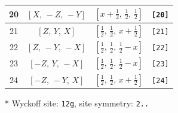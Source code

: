 \documentclass[fleqn,8pt]{jsarticle}
\begin{document}
\begin{longtable}{cccc}
20 & $\left[ X,\, - Z,\, - Y \right]$ & $\left[ x + \frac{1}{2},\, \frac{1}{2},\, \frac{1}{2} \right]$ & {\tt [20]} \\ \hline
21 & $\left[ Z,\, Y,\, X \right]$ & $\left[ \frac{1}{2},\, \frac{1}{2},\, x + \frac{1}{2} \right]$ & {\tt [21]} \\ \hline
22 & $\left[ Z,\, - Y,\, - X \right]$ & $\left[ \frac{1}{2},\, \frac{1}{2},\, \frac{1}{2} - x \right]$ & {\tt [22]} \\ \hline
23 & $\left[ - Z,\, Y,\, - X \right]$ & $\left[ \frac{1}{2},\, \frac{1}{2},\, \frac{1}{2} - x \right]$ & {\tt [23]} \\ \hline
24 & $\left[ - Z,\, - Y,\, X \right]$ & $\left[ \frac{1}{2},\, \frac{1}{2},\, x + \frac{1}{2} \right]$ & {\tt [24]} \\
\end{longtable}
* Wyckoff site: {\tt 12g}, site symmetry: {\tt 2..}
\renewcommand{\arraystretch}{1.2}
\end{document}
